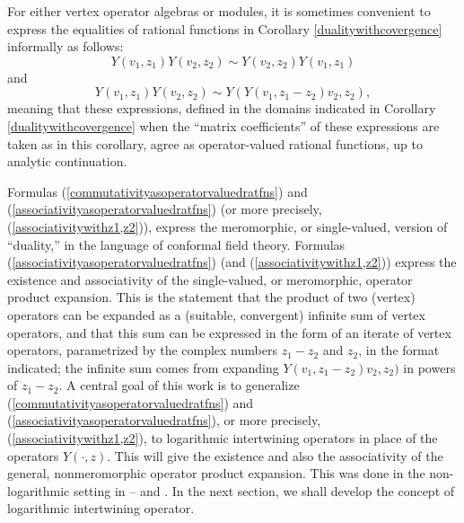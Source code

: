 \documentclass[12pt]{article}
\begin{document}
For either vertex operator algebras or modules, it is sometimes
convenient to express the equalities of rational functions in
Corollary \ref{dualitywithcovergence} informally as follows:
\begin{equation}\label{commutativityasoperatorvaluedratfns}
Y(v_{1}, z_{1})Y(v_{2}, z_{2}) \sim Y(v_{2}, z_{2})Y(v_{1}, z_{1})
\end{equation}
and
\begin{equation}\label{associativityasoperatorvaluedratfns}
Y(v_{1}, z_{1})Y(v_{2}, z_{2}) \sim Y(Y(v_{1}, z_1-z_2)v_{2},z_{2}),
\end{equation}
meaning that these expressions, defined in the domains indicated in
Corollary \ref{dualitywithcovergence} when the ``matrix coefficients''
of these expressions are taken as in this corollary, agree as
operator-valued rational functions, up to analytic continuation.

\begin{rema}\label{OPE}{\rm
Formulas (\ref{commutativityasoperatorvaluedratfns}) and
(\ref{associativityasoperatorvaluedratfns}) (or more precisely,
(\ref{associativitywithz1,z2})), express the meromorphic, or
single-valued, version of ``duality,'' in the language of conformal
field theory.  Formulas (\ref{associativityasoperatorvaluedratfns})
(and (\ref{associativitywithz1,z2})) express the existence and
associativity of the single-valued, or meromorphic, operator product
expansion.  This is the statement that the product of two (vertex)
operators can be expanded as a (suitable, convergent) infinite sum of
vertex operators, and that this sum can be expressed in the form of an
iterate of vertex operators, parametrized by the complex numbers
$z_1-z_2$ and $z_2$, in the format indicated; the infinite sum comes
{}from expanding $Y(v_{1}, z_1-z_2)v_{2},z_{2})$ in powers of $z_1-z_2$.
A central goal of this work is to generalize
(\ref{commutativityasoperatorvaluedratfns}) and
(\ref{associativityasoperatorvaluedratfns}), or more precisely,
(\ref{associativitywithz1,z2}), to logarithmic intertwining operators
in place of the operators $Y(\cdot,z)$.  This will give the existence
and also the associativity of the general, nonmeromorphic operator
product expansion.  This was done in the non-logarithmic setting in
\cite{tensor1}--\cite{tensor3} and \cite{tensor4}.  In the next
section, we shall develop the concept of logarithmic intertwining
operator.
}
\end{rema}



\end{document}
